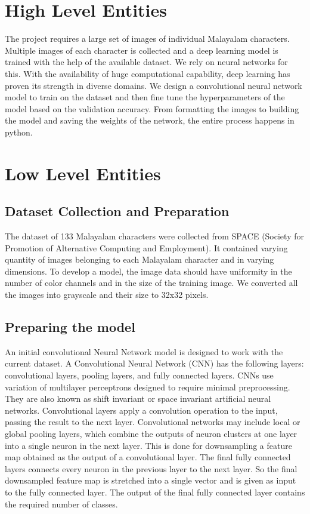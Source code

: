 \documentclass[12pt]{report}
\begin{document}
\section*{High Level Entities}
The project requires a large set of images of individual Malayalam characters. Multiple images of each character is collected and a deep learning model is trained with the help of the available dataset. We rely on neural networks for this. With the availability of huge computational capability, deep learning has proven its strength in diverse domains. We design a convolutional neural network model to train on the dataset and then fine tune the hyperparameters of the model based on the validation accuracy. From formatting the images to building the model and saving the weights of the network, the entire process happens in python. 

\section*{Low Level Entities}
\subsection*{Dataset Collection and Preparation}
The dataset of 133 Malayalam characters were collected from SPACE (Society for Promotion of Alternative Computing and Employment). It contained varying quantity of images belonging to each Malayalam character and in varying dimensions. To develop a model, the image data should have uniformity in the number of color channels and in the size of the training image. We converted all the images into grayscale and their size to 32x32 pixels. 
\subsection*{Preparing the model}

An initial convolutional Neural Network model is designed to work with the current dataset. A Convolutional Neural Network (CNN) has the following  layers: convolutional layers, pooling layers, and fully connected layers. CNNs use variation of multilayer perceptrons designed to require minimal preprocessing. They are also known as shift invariant or space invariant artificial neural networks. Convolutional layers apply a convolution operation to the input, passing the result to the next layer. Convolutional networks may include local or global pooling layers, which combine the outputs of neuron clusters at one layer into a single neuron in the next layer. This is done for downsampling a feature map obtained as the output of a convolutional layer. The final fully connected layers connects every neuron in the previous layer to the next layer. So the final downsampled feature map is stretched into a single vector and is given as input to the fully connected layer. The output of the final fully connected layer contains the required number of classes. 
\end{document}
